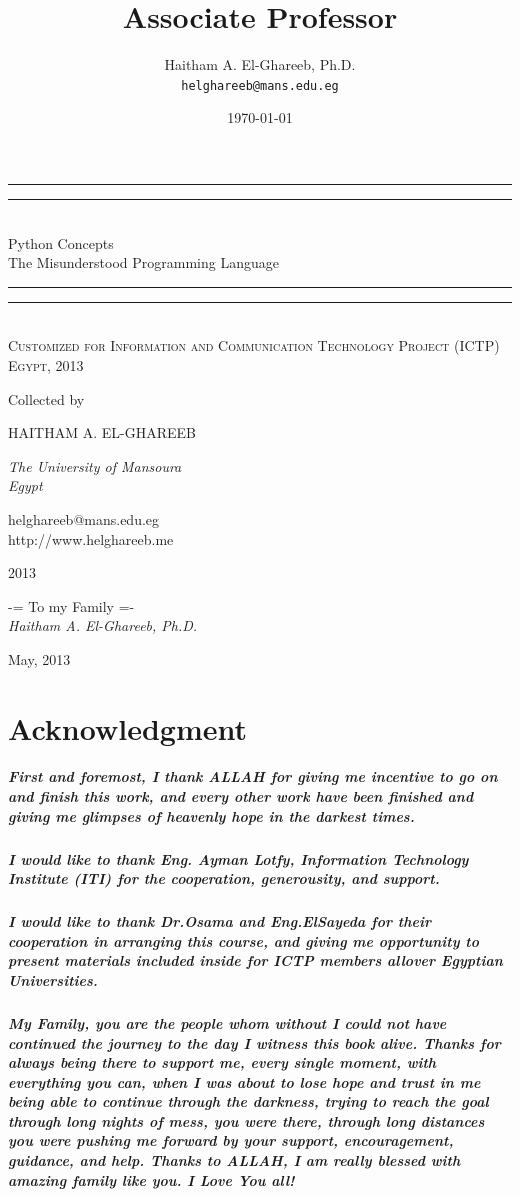 \documentclass[12pt,a4paper,final,twoside,onecolumn,titlepage]{book}
\author{Haitham A. El-Ghareeb, Ph.D. \\ \texttt{helghareeb@mans.edu.eg}}
\title{Associate Professor}
\date{\today}
\makeatletter
\newcommand*{\plogo}{\fbox{$\mathcal{PL}$}} %
\newcommand*{\titleGP}{\begingroup %
\centering %
\vspace*{\baselineskip} %

\rule{\textwidth}{1.6pt}\vspace*{-\baselineskip}\vspace*{2pt} %
\rule{\textwidth}{0.4pt}\\[\baselineskip] %

{\LARGE Python Concepts \\ The Misunderstood Programming Language}\\[0.2\baselineskip] %

\rule{\textwidth}{0.4pt}\vspace*{-\baselineskip}\vspace{3.2pt} %
\rule{\textwidth}{1.6pt}\\[\baselineskip] %

\scshape %
Customized for Information and Communication Technology Project (ICTP) \\[\baselineskip] %
Egypt,  2013\par %

\vspace*{2\baselineskip} %

Collected by \\[\baselineskip]
{\Large HAITHAM A. EL-GHAREEB \par} %
{\itshape The University of Mansoura \\ Egypt\par} %

\vfill %

{\large helghareeb@mans.edu.eg \\ http://www.helghareeb.me}\par %
{\scshape 2013} \\[0.3\baselineskip] %

\endgroup}
\makeatother
\begin{document}
\frontmatter


\thispagestyle{empty}
\titleGP %


\cleardoublepage
\thispagestyle{empty}
\begin{center}
-= To my Family =- \\
\textit{Haitham A. El-Ghareeb, Ph.D.}
\end{center}

\begin{flushright}
May, 2013
\end{flushright}

\cleardoublepage
{}
\chapter{Acknowledgment}
\thispagestyle{empty}
\paragraph*{
First and foremost, I thank ALLAH for giving me incentive to go on and finish this work, and every other work have been finished and giving me glimpses of heavenly hope in the darkest times.}

\paragraph*{I would like to thank Eng. Ayman Lotfy, Information Technology Institute (ITI) for the cooperation, generousity, and support.}

\paragraph*{I would like to thank Dr.Osama and Eng.ElSayeda for their cooperation in arranging this course, and giving me opportunity to present materials included inside for ICTP members allover Egyptian Universities.}

\paragraph*{My Family, you are the people whom without I could not have continued the journey to the day I witness this book alive. Thanks for always being there to support me, every single moment, with everything you can, when I was about to lose hope and trust in me being able to continue through the darkness, trying to reach the goal through long nights of mess, you were there, through long distances you were pushing me forward by your support, encouragement, guidance, and help. Thanks to ALLAH, I am really blessed with amazing family like you. I Love You all!}
\end{document}
